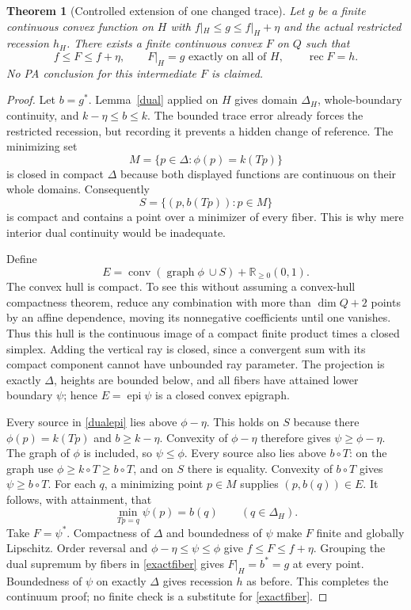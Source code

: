 \documentclass[11pt]{article}
\newtheorem{theorem}{Theorem}[section]
\theoremstyle{definition}\newtheorem{definition}[theorem]{Definition}
\theoremstyle{remark}\newtheorem{remark}[theorem]{Remark}
\newcommand{\R}{\mathbb R}\newcommand{\Q}{\mathbb Q}
\newcommand{\epi}{\operatorname{epi}}\newcommand{\conv}{\operatorname{conv}}
\newcommand{\rec}{\operatorname{rec}}\newcommand{\dom}{\operatorname{dom}}
\begin{document}
\begin{theorem}[Controlled extension of one changed trace]\label{trace}
Let $g$ be a finite continuous convex function on $H$ with
$f|_H\leq g\leq f|_H+\eta$ and the actual restricted recession $h_H$. There exists a finite continuous convex $F$ on $Q$ such that
\[
f\leq F\leq f+\eta,\qquad F|_H=g\text{ exactly on all of }H,\qquad \rec F=h.
\]
No PA conclusion for this intermediate $F$ is claimed.
\end{theorem}
\begin{proof}
Let $b=g^*$. Lemma~\ref{dual} applied on $H$ gives domain $\Delta_H$, whole-boundary continuity, and
$k-\eta\leq b\leq k$. The bounded trace error already forces the restricted recession, but recording it prevents a hidden change of reference. The minimizing set
\[
M=\{p\in\Delta:\phi(p)=k(Tp)\}
\]
is closed in compact $\Delta$ because both displayed functions are continuous on their whole domains. Consequently
\begin{equation}\label{S}
S=\{(p,b(Tp)):p\in M\}
\end{equation}
is compact and contains a point over a minimizer of every fiber. This is why mere interior dual continuity would be inadequate.

Define
\begin{equation}\label{dualepi}
E=\conv(\operatorname{graph}\phi\ \cup S)+\R_{\geq0}(0,1).
\end{equation}
The convex hull is compact. To see this without assuming a convex-hull compactness theorem, reduce any combination with more than $\dim Q+2$ points by an affine dependence, moving its nonnegative coefficients until one vanishes. Thus this hull is the continuous image of a compact finite product times a closed simplex. Adding the vertical ray is closed, since a convergent sum with its compact component cannot have unbounded ray parameter. The projection is exactly $\Delta$, heights are bounded below, and all fibers have attained lower boundary $\psi$; hence $E=\epi\psi$ is a closed convex epigraph.

Every source in \eqref{dualepi} lies above $\phi-\eta$. This holds on $S$ because there $\phi(p)=k(Tp)$ and $b\geq k-\eta$. Convexity of $\phi-\eta$ therefore gives $\psi\geq\phi-\eta$. The graph of $\phi$ is included, so $\psi\leq\phi$. Every source also lies above $b\circ T$: on the graph use $\phi\geq k\circ T\geq b\circ T$, and on $S$ there is equality. Convexity of $b\circ T$ gives $\psi\geq b\circ T$. For each $q$, a minimizing point $p\in M$ supplies $(p,b(q))\in E$. It follows, with attainment, that
\begin{equation}\label{exactfiber}
\min_{Tp=q}\psi(p)=b(q)\qquad(q\in\Delta_H).
\end{equation}
Take $F=\psi^*$. Compactness of $\Delta$ and boundedness of $\psi$ make $F$ finite and globally Lipschitz. Order reversal and $\phi-\eta\leq\psi\leq\phi$ give $f\leq F\leq f+\eta$. Grouping the dual supremum by fibers in \eqref{exactfiber} gives $F|_H=b^*=g$ at every point. Boundedness of $\psi$ on exactly $\Delta$ gives recession $h$ as before. This completes the continuum proof; no finite check is a substitute for \eqref{exactfiber}.
\end{proof}
\end{document}
